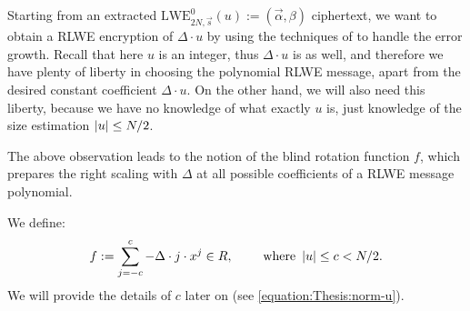 \documentclass[letterpaper,10pt,english]{jupyterBook}
\begin{document}
\sphinxAtStartPar
Starting from an extracted \(\mathrm{LWE}_{2N,\vec s}^0(u) := (\vec \alpha, \beta)\) ciphertext, we want to obtain a RLWE encryption of \(\Delta \cdot u\) by using the techniques of {\hyperref[\detokenize{Thesis:preparations-for-bootstrapping}]{}} to handle the error growth.
Recall that here \(u\) is an integer, thus \(\Delta \cdot u\) is as well, and therefore we have plenty of liberty in choosing the polynomial RLWE message, apart from the desired constant coefficient \(\Delta \cdot u\).
On the other hand, we will also need this liberty, because we have no knowledge of what exactly \(u\) is, just knowledge of the size estimation \(\left\lvert u \right\rvert \le N/2\).

\begin{DUlineblock}{0em}
\item[] 
\end{DUlineblock}

\sphinxAtStartPar
The above observation leads to the notion of the blind rotation function \(f\), which prepares the right scaling with \(\Delta\) at all possible coefficients of a RLWE message polynomial.

\sphinxAtStartPar
We define:
\begin{equation*}
\begin{split}f := \sum_{j=-c}^c -\Delta\cdot j \cdot x^j \in R, \qquad \text{ where } \left\lvert u \right\rvert \le c < N/2.\end{split}
\end{equation*}
\sphinxAtStartPar
We will provide the details of \(c\) later on (see \eqref{equation:Thesis:norm-u}).
\end{document}
